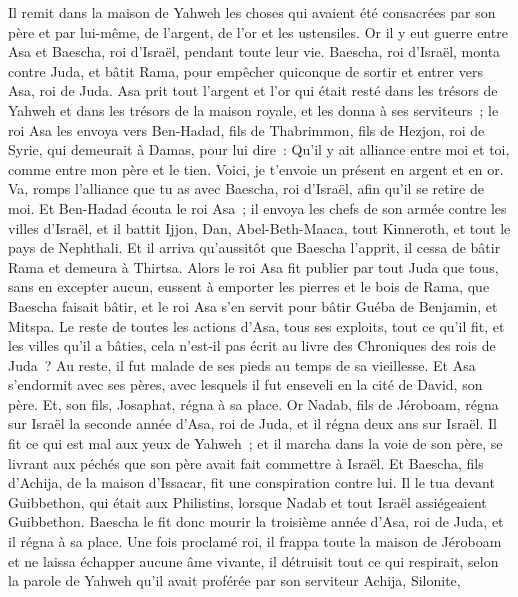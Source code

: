 \begin{multicols}{2}
Il remit dans la maison de Yahweh les choses qui avaient été consacrées par son père et par lui-même, de l'argent, de l'or et les ustensiles.
Or il y eut guerre entre Asa et Baescha, roi d'Israël, pendant toute leur vie.
Baescha, roi d'Israël, monta contre Juda, et bâtit Rama, pour empêcher quiconque de sortir et entrer vers Asa, roi de Juda.
Asa prit tout l'argent et l'or qui était resté dans les trésors de Yahweh et dans les trésors de la maison royale, et les donna à ses serviteurs~; le roi Asa les envoya vers Ben-Hadad, fils de Thabrimmon, fils de Hezjon, roi de Syrie, qui demeurait à Damas, pour lui dire~:
Qu'il y ait alliance entre moi et toi, comme entre mon père et le tien. Voici, je t'envoie un présent en argent et en or. Va, romps l'alliance que tu as avec Baescha, roi d'Israël, afin qu'il se retire de moi.
Et Ben-Hadad écouta le roi Asa~; il envoya les chefs de son armée contre les villes d'Israël, et il battit Ijjon, Dan, Abel-Beth-Maaca, tout Kinneroth, et tout le pays de Nephthali.
Et il arriva qu'aussitôt que Baescha l'apprit, il cessa de bâtir Rama et demeura à Thirtsa.
Alors le roi Asa fit publier par tout Juda que tous, sans en excepter aucun, eussent à emporter les pierres et le bois de Rama, que Baescha faisait bâtir, et le roi Asa s'en servit pour bâtir Guéba de Benjamin, et Mitspa.
Le reste de toutes les actions d'Asa, tous ses exploits, tout ce qu'il fit, et les villes qu'il a bâties, cela n'est-il pas écrit au livre des Chroniques des rois de Juda~? Au reste, il fut malade de ses pieds au temps de sa vieillesse.
Et Asa s'endormit avec ses pères, avec lesquels il fut enseveli en la cité de David, son père. Et, son fils, Josaphat, régna à sa place.
Or Nadab, fils de Jéroboam, régna sur Israël la seconde année d'Asa, roi de Juda, et il régna deux ans sur Israël.
Il fit ce qui est mal aux yeux de Yahweh~; et il marcha dans la voie de son père, se livrant aux péchés que son père avait fait commettre à Israël.
Et Baescha, fils d'Achija, de la maison d'Issacar, fit une conspiration contre lui. Il le tua devant Guibbethon, qui était aux Philistins, lorsque Nadab et tout Israël assiégeaient Guibbethon.
Baescha le fit donc mourir la troisième année d'Asa, roi de Juda, et il régna à sa place.
Une fois proclamé roi, il frappa toute la maison de Jéroboam et ne laissa échapper aucune âme vivante, il détruisit tout ce qui respirait, selon la parole de Yahweh qu'il avait proférée par son serviteur Achija, Silonite,

\end{multicols}
